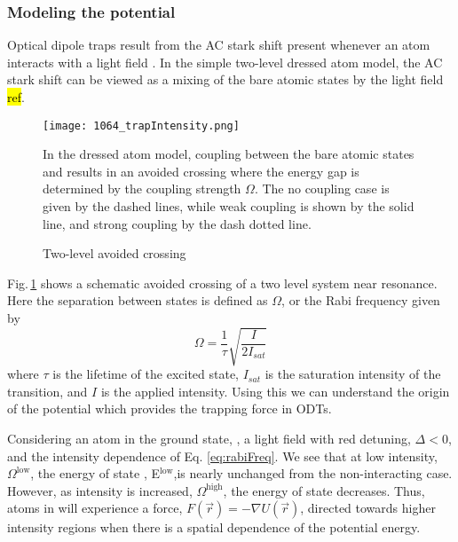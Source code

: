 \subsubsection{Modeling the potential} \label{sssec:1064_modeling}
Optical dipole traps result from the AC stark shift present whenever an atom interacts with a light field \cite{Grimm1999a}.
In the simple two-level dressed atom model, the AC stark shift can be viewed as a mixing of the bare atomic states by the light field \hl{ref}.
	\begin{figure} 
		\centerline{
		\texttt{[image: 1064\_trapIntensity.png]}}
		\caption{Two-level avoided crossing}{In the dressed atom model, coupling between the bare atomic states  and  results in an avoided crossing where the energy gap is determined by the coupling strength $\Omega$. The no coupling case is given by the dashed lines, while weak coupling is shown by the solid line, and strong coupling by the dash dotted line.}
		\label{fig:avoidedCrossing}
	\end{figure}
Fig.\,\ref{fig:avoidedCrossing} shows a schematic avoided crossing of a two level system near resonance.
Here the separation between states is defined as $\Omega$, or the Rabi frequency given by
\begin{equation}
	\Omega = \frac{1}{\tau} \sqrt{\frac{I}{2I_{sat}}}
	\label{eq:rabiFreq}
\end{equation}
where $\tau$ is the lifetime of the excited state, $I_{sat}$ is the saturation intensity of the transition, and $I$ is the applied intensity.
Using this we can understand the origin of the potential which provides the trapping force in ODTs.

Considering an atom in the ground state, , a light field with red detuning, $\Delta < 0$, and the intensity dependence of Eq. \ref{eq:rabiFreq}.
We see that at low intensity, $\Omega^{\text{low}}$, the energy of state , E$^{\text{low}}$,is nearly unchanged from the non-interacting case.
However, as intensity is increased, $\Omega^{\text{high}}$, the energy of state  decreases. 
Thus, atoms in  will experience a force, $F(\vec{r}) = -\nabla U(\vec{r})$, directed towards higher intensity regions when there is a spatial dependence of the potential energy.

